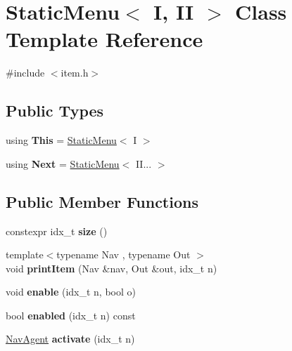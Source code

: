 \hypertarget{classStaticMenu}{}\section{Static\+Menu$<$ I, II $>$ Class Template Reference}
\label{classStaticMenu}


{\ttfamily \#include $<$item.\+h$>$}

\subsection*{Public Types}
\begin{DoxyCompactItemize}
\item 
\mbox{\label{classStaticMenu_af5a92e27a1dc146ef1a6facfb870b245}} 
using {\bfseries This} = \hyperlink{classStaticMenu}{Static\+Menu}$<$ I $>$
\item 
\mbox{\label{classStaticMenu_a85c856832cde6a24cdfff1fa28891017}} 
using {\bfseries Next} = \hyperlink{classStaticMenu}{Static\+Menu}$<$ I\+I... $>$
\end{DoxyCompactItemize}
\subsection*{Public Member Functions}
\begin{DoxyCompactItemize}
\item 
\mbox{\label{classStaticMenu_a7b958c98761a7974d927041f9c659779}} 
constexpr idx\+\_\+t {\bfseries size} ()
\item 
\mbox{\label{classStaticMenu_a0cb879980a1886111d9d6307510ca7c9}} 
{\footnotesize template$<$typename Nav , typename Out $>$ }\\void {\bfseries print\+Item} (Nav \&nav, Out \&out, idx\+\_\+t n)
\item 
\mbox{\label{classStaticMenu_ad92d5faa9b949038b1fbfe77e20a6674}} 
void {\bfseries enable} (idx\+\_\+t n, bool o)
\item 
\mbox{\label{classStaticMenu_ab7a3a6c422252f5d2cc467bed2d36e2c}} 
bool {\bfseries enabled} (idx\+\_\+t n) const
\item 
\mbox{\label{classStaticMenu_ab5c6265bc72ce75ff112c65d68272aa5}} 
\hyperlink{structNavAgent}{Nav\+Agent} {\bfseries activate} (idx\+\_\+t n)
\end{DoxyCompactItemize}

